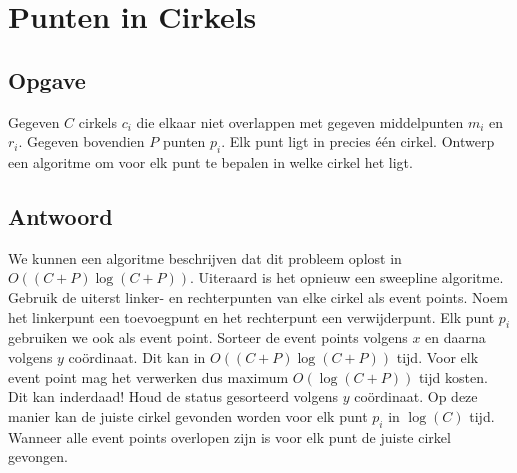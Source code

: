 \documentclass[examenvragen.tex]{subfiles}
\begin{document}
\section{Punten in Cirkels}
\subsection{Opgave}
Gegeven $C$ cirkels $c_i$ die elkaar niet overlappen met gegeven middelpunten $m_i$ en $r_i$. Gegeven bovendien $P$ punten $p_i$. Elk punt ligt in precies \'e\'en cirkel.
Ontwerp een algoritme om voor elk punt te bepalen in welke cirkel het ligt. 

\subsection{Antwoord}
We kunnen een algoritme beschrijven dat dit probleem oplost in $O((C+P)\log(C+P))$. Uiteraard is het opnieuw een sweepline algoritme.
Gebruik de uiterst linker- en rechterpunten van elke cirkel als event points. Noem het linkerpunt een toevoegpunt en het rechterpunt een verwijderpunt. Elk punt $p_i$ gebruiken we ook als event point. Sorteer de event points volgens $x$ en daarna volgens $y$ co\"ordinaat. Dit kan in $O((C+P)\log(C+P))$ tijd. Voor elk event point mag het verwerken dus maximum $O(\log(C+P))$ tijd kosten. Dit kan inderdaad! Houd de status gesorteerd volgens $y$ co\"ordinaat. Op deze manier kan de juiste cirkel gevonden worden voor elk punt $p_i$ in $\log(C)$ tijd. Wanneer alle event points overlopen zijn is voor elk punt de juiste cirkel gevongen.
 
\end{document}
